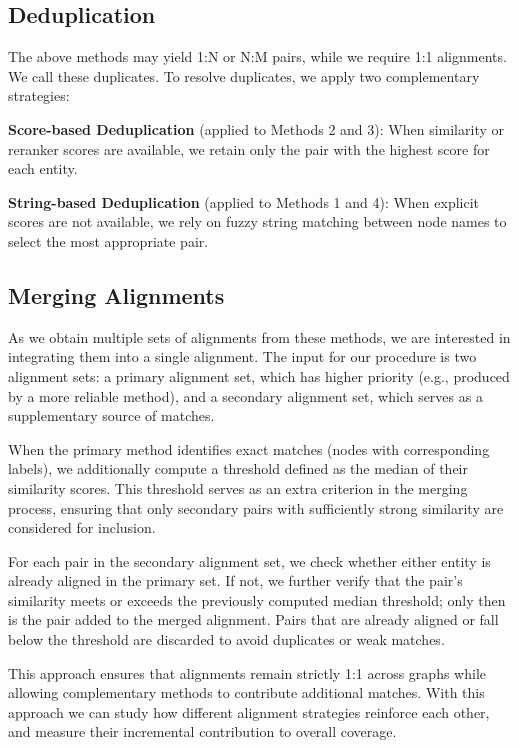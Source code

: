 \documentclass[11pt]{article}
\begin{document}
\subsection{Deduplication}

The above methods may yield 1:N or N:M pairs, while we require 1:1 alignments. We call these duplicates. To resolve duplicates, we apply two complementary strategies:

\textbf{Score-based Deduplication} (applied to Methods 2 and 3): When similarity or reranker scores are available, we retain only the pair with the highest score for each entity.

\textbf{String-based Deduplication} (applied to Methods 1 and 4): When explicit scores are not available, we rely on fuzzy string matching between node names to select the most appropriate pair.

\subsection{Merging Alignments}
\label{sec:merging_alignments}

As we obtain multiple sets of alignments from these methods, we are interested in integrating them into a single alignment. The input for our procedure is two alignment sets: a primary alignment set, which has higher priority (e.g., produced by a more reliable method), and a secondary alignment set, which serves as a supplementary source of matches.

When the primary method identifies exact matches (nodes with corresponding labels), we additionally compute a threshold defined as the median of their similarity scores. This threshold serves as an extra criterion in the merging process, ensuring that only secondary pairs with sufficiently strong similarity are considered for inclusion.

For each pair in the secondary alignment set, we check whether either entity is already aligned in the primary set. If not, we further verify that the pair’s similarity meets or exceeds the previously computed median threshold; only then is the pair added to the merged alignment. Pairs that are already aligned or fall below the threshold are discarded to avoid duplicates or weak matches.

This approach ensures that alignments remain strictly 1:1 across graphs while allowing complementary methods to contribute additional matches. With this approach we can study how different alignment strategies reinforce each other, and measure their incremental contribution to overall coverage.
\end{document}
